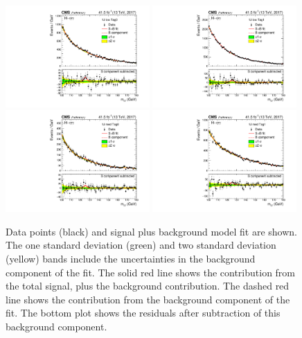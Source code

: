 \begin{figure}[hptb]
  \centering
  \includegraphics[width=0.49\textwidth]{Figures/Appendices/_forAppendix2017ch2_RECO_1J_PTH_0_60_Tag0_13TeV.pdf}
  \includegraphics[width=0.49\textwidth]{Figures/Appendices/_forAppendix2017ch2_RECO_1J_PTH_0_60_Tag1_13TeV.pdf}
  \includegraphics[width=0.49\textwidth]{Figures/Appendices/_forAppendix2017ch2_RECO_1J_PTH_60_120_Tag0_13TeV.pdf}
  \includegraphics[width=0.49\textwidth]{Figures/Appendices/_forAppendix2017ch2_RECO_1J_PTH_60_120_Tag1_13TeV.pdf}
  \caption[Signal plus background fits to data.]
  {
    Data points (black) and signal plus background model fit are shown. 
    The one standard deviation (green) and two standard deviation (yellow) bands 
    include the uncertainties in the background component of the fit. 
    The solid red line shows the contribution from the total signal, plus the background contribution. 
    The dashed red line shows the contribution from the background component of the fit. 
    The bottom plot shows the residuals after subtraction of this background component.
  }
\end{figure}

